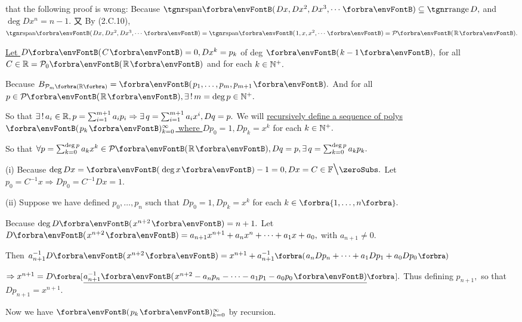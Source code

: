  \;\NOTICE that the following proof is wrong:\parSol{}
Because $\Span{Dx,Dx^2,Dx^3,\cdots}\subseteq\range D,$ and $\deg Dx^n=n-1.$\parSol{}
又 By (2.C.10), $\Span{Dx,Dx^2,Dx^3,\cdots}=\Span{1,x,x^2,\cdots}=\PoR{}.$\par\vspace{6pt}\quad
\uline{Let $D\Par{C}=0,Dx^k=p_k$} of deg $\Par{k-1},$ for all $C\in\Rbb=\PoR{0}$ and for each $k\in{\mathbb{N}^+}.$\par\quad
Because $B_{\PoR[\SmallPar]{m}}=\Par{p_1,\dots,p_m,p_{m+1}}.$ And for all $p\in\PoR{},\exists\,!\,m=\deg p\in\Nbp.$\par\quad
So that $\exists\,!\,a_i\in{\mathbb{R}},p=\sum_{i=1}^{m+1}a_ip_i\Rightarrow\exists\,q=\sum_{i=1}^{m+1}a_{i}x^{i},Dq=p.$\PfEnd\vspace{8pt}\quad
{\Or We will \uline{recursively define a sequence of polys $\Par{p_k}{_{k=0}^\infty}$ where $Dp_0=1,Dp_k=x^k$} for each $k\in{\mathbb{N}^+}.$}\par\vspace{2pt}\quad
{\normalsize\envFontSmall So that $\forall p=\sum_{k=0}^{\deg p}a_k x^k\in\PoR{},Dq=p,\exists\,q={\sum_{k=0}^{\deg p}a_k p_k}.$}\par\vspace{4pt}\quad
(i) {Because $\deg Dx=\Par{\deg x}-1=0,Dx=C\in\nonzeroFbb.$ Let $p_0=C^{-1}x\Rightarrow Dp_0=C^{-1}Dx=1.$}\vspace{2pt}\par\quad\Endi
(ii) {Suppose we have defined $p_0,\dots,p_n$ such that $Dp_0=1,Dp_k=x^k$ for each $k\in\Bra{1,\dots,n}.$}\vspace{2pt}\par\quad\Hii
{Because $\deg D\Par{x^{n+2}}=n+1.$ Let {\;$D\Par{x^{n+2}}=a_{n+1}x^{n+1}+a_n x^n+\dots+a_1 x+a_0,$} with $a_{n+1}\neq 0.$}\vspace{2pt}\par\quad\Hii
{Then {\;$a_{n+1}^{-1}D\Par{x^{n+2}}=x^{n+1}+a_{n+1}^{-1}\BigPar{a_n Dp_n+\dots+a_1 Dp_1 +a_0 Dp_0}$}}\vspace{2pt}\par\quad\Hii
{$\Rightarrow x^{n+1}=D\Sbra{\uline{a_{n+1}^{-1}\Par{x^{n+2}-a_n p_n-\dots-a_1 p_1-a_0 p_0}}}.$ Thus defining $p_{n+1},$ so that $Dp_{n+1}=x^{n+1}.$}\par\vspace{4pt}\quad
{Now we have $\Par{p_k}{_{k=0}^\infty}$ by recursion.}\PfEnd
\SepLine\pagebreak

